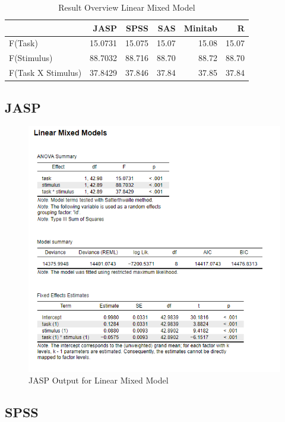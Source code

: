 \documentclass[
]{book}
\begin{document}
\begin{table}

\caption{\label{tab:unnamed-chunk-79}Result Overview Linear Mixed Model}
\centering
\begin{tabular}[t]{lrrrrr}
\toprule
  & JASP & SPSS & SAS & Minitab & R\\
\midrule
F(Task) & 15.0731 & 15.075 & 15.07 & 15.08 & 15.07\\
F(Stimulus) & 88.7032 & 88.716 & 88.70 & 88.72 & 88.70\\
F(Task X Stimulus) & 37.8429 & 37.846 & 37.84 & 37.85 & 37.84\\
\bottomrule
\end{tabular}
\end{table}

\hypertarget{jasp}{%
\subsection{JASP}\label{jasp}}

\begin{figure}[!h]
\includegraphics{Screenshots/Linear Mixed Model/lmmJASP} \caption{\label{fig:lmmJASP}JASP Output for Linear Mixed Model}\label{fig:lmmJASP}
\end{figure}

\hypertarget{spss}{%
\subsection{SPSS}\label{spss}}
\end{document}
